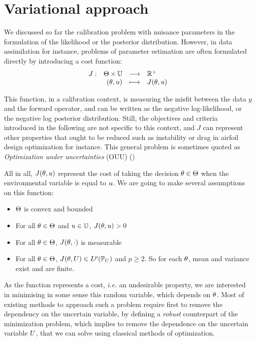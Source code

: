 \documentclass[../../Main_ManuscritThese.tex]{subfiles}
\begin{document}
\clearpage
\section{Variational approach}
\label{sec:J_rv}
We discussed so far the calibration problem with nuisance parameters in the formulation of the likelihood or the posterior distribution. However, in data assimilation for instance, problems of parameter estimation are often formulated directly by introducing a cost function:
\begin{equation}
  \begin{array}{rrcl}
    J: &\Theta \times \mathbb{U} &\longrightarrow& \mathbb{R}^+ \\
    &(\theta, u) &\longmapsto &J(\theta, u)
    \end{array}
  \end{equation}
  
This function, in a calibration context, is measuring the misfit between the data $y$ and the forward operator, and can be written as the negative log-likelihood, or the negative log posterior distribution. Still, the objectives and criteria introduced in the following are not specific to this context, and $J$ can represent other properties that ought to be reduced such as instability or drag in airfoil design optimization for instance. This general problem is sometimes quoted as \emph{Optimization under uncertainties} (OUU) (\cite{cook_effective_2018,seshadri_density-matching_2014})


All in all, $J(\theta, u)$ represent the cost of taking the decision $\theta\in\Theta$ when the environmental variable is equal to $u$.
We are going to make several assumptions on this function:
\begin{itemize}
\item $\Theta$ is convex and bounded 
\item For all $\theta \in \Theta$ and $u \in \mathbb{U}$, $J(\theta, u)>0$
\item For all $\theta \in \Theta$, $J(\theta, \cdot)$ is measurable
\item For all $\theta \in \Theta$, $J(\theta, U) \in L^p(\mathbb{P}_{U})$ and $p \geq 2$. So for each $\theta$, mean and variance exist and are finite.
\end{itemize}

As the function represents a cost, \emph{i.e.} an undesirable property, we are interested in minimising in some sense this random variable, which depends on $\theta$.
Most of existing methods to approach such a problem require first to remove the dependency on the uncertain variable, by defining a \emph{robust} counterpart of the minimization problem, which implies to remove the dependence on the uncertain variable $U$, that we can solve using classical methods of optimization.
\end{document}
